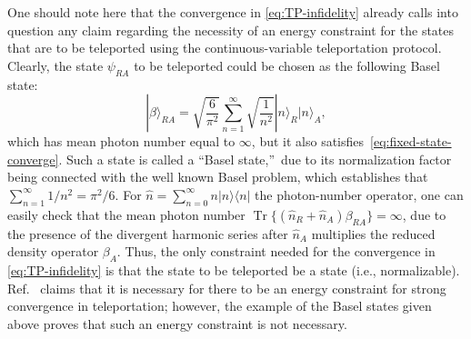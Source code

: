 \documentclass[apsrev,twocolumn]{revtex4-1}%
\begin{document}
One should note here that the convergence in \eqref{eq:TP-infidelity} already
calls into question any claim regarding the necessity of an energy constraint
for the states that are to be teleported using the continuous-variable
teleportation protocol.
Clearly, the state $\psi_{RA}$ to be teleported could be chosen as the
following Basel state:%
\begin{equation}
|\beta\rangle_{RA}=\sqrt{\frac{6}{\pi^{2}}}\sum_{n=1}^{\infty}\sqrt{\frac
{1}{n^{2}}}|n\rangle_{R}|n\rangle_{A}, \label{eq:entangled-Basel-state}%
\end{equation}
which has mean photon number equal to $\infty$, but it also
satisfies~\eqref{eq:fixed-state-converge}. Such a state is called a
\textquotedblleft Basel state,\textquotedblright\ due to its normalization
factor being connected with the well known Basel problem, which establishes
that $\sum_{n=1}^{\infty}1/n^{2}=\pi^{2}/6$. For $\hat{n}=\sum_{n=0}^{\infty
}n|n\rangle\langle n|$ the photon-number operator, one can easily check that
the mean photon number $\operatorname{Tr}\{(\hat{n}_{R}+\hat{n}_{A})\beta
_{RA}\}=\infty$, due to the presence of the divergent harmonic series after
$\hat{n}_{A}$ multiplies the reduced density operator $\beta_{A}$. Thus, the
only constraint needed for the convergence in \eqref{eq:TP-infidelity} is that
the state to be teleported be a state (i.e., normalizable). Ref.~\cite{P17} claims that it is necessary for there to be an energy constraint for strong convergence in teleportation; however, the example of the Basel states given above proves that such an energy constraint is not necessary. 
\end{document}
